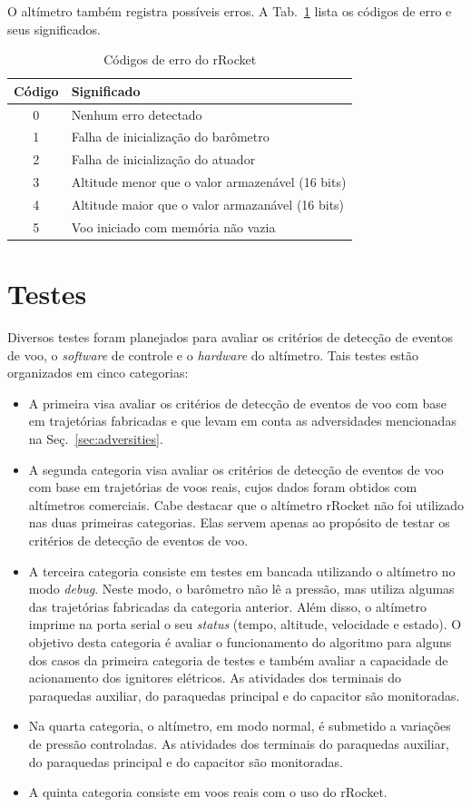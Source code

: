 \documentclass[12pt,a4paper]{article}
\begin{document}
O altímetro também registra possíveis erros. A Tab.~\ref{tab:erros} lista os códigos de erro e seus significados.
\begin{table}[!ht]
	\caption{Códigos de erro do rRocket}
	\small
	\centering
	\begin{tabular}{c|p{8cm}}
		\hline
		\hline
		Código&Significado\\
		\hline
		0& Nenhum erro detectado\\
		1& Falha de inicialização do barômetro\\
		2& Falha de inicialização do atuador\\
		3& Altitude menor que o valor armazenável (16 bits)\\
		4& Altitude maior que o valor armazanável (16 bits)\\
		5& Voo iniciado com memória não vazia\\
		\hline
		\hline
	\end{tabular}
	\label{tab:erros}
\end{table}

\section{Testes}

Diversos testes foram planejados para avaliar os critérios de detecção de eventos de voo, o \textit{software} de controle e o \textit{hardware} do altímetro. Tais testes estão organizados em cinco categorias:
\begin{itemize}
	\item  
	A primeira visa avaliar os critérios de detecção de eventos de voo com base em trajetórias fabricadas e que levam em conta as adversidades mencionadas na Seç.~\ref{sec:adversities}. 
	\item A segunda categoria visa avaliar os critérios de detecção de eventos de voo com base em trajetórias de voos reais, cujos dados foram obtidos com altímetros comerciais. Cabe destacar que o altímetro rRocket não foi utilizado nas duas primeiras categorias. Elas servem apenas ao propósito de testar os critérios de detecção de eventos de voo. 
	\item A terceira categoria consiste em testes em bancada utilizando o altímetro no modo \textit{debug}. Neste modo, o barômetro não lê a pressão, mas utiliza algumas das trajetórias fabricadas da categoria anterior. Além disso, o altímetro imprime na porta serial o seu \textit{status} (tempo, altitude, velocidade e estado). O objetivo desta categoria é avaliar o funcionamento do algoritmo para alguns dos casos da primeira categoria de testes e também avaliar a capacidade de acionamento dos ignitores elétricos. As atividades dos terminais do paraquedas auxiliar, do paraquedas principal e do capacitor são monitoradas. 
	\item Na quarta categoria, o altímetro, em modo normal, é submetido a variações de pressão controladas. As atividades dos terminais do paraquedas auxiliar, do paraquedas principal e do capacitor são monitoradas. 
	\item A quinta categoria consiste em voos reais com o uso do rRocket.
\end{itemize}
\end{document}
